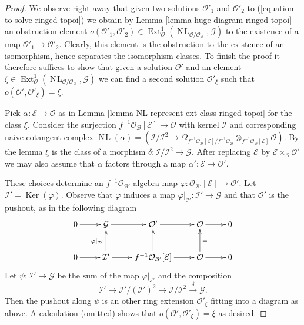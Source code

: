 \documentclass{stacks-project}
\theoremstyle{plain}
\theoremstyle{definition}
\theoremstyle{remark}
\numberwithin{equation}{subsection}
\def\Ext{\mathop{\mathrm{Ext}}\nolimits}
\def\NL{\mathop{N\!L}\nolimits}
\def\Ker{\mathop{\mathrm{Ker}}}
\begin{document}
\begin{proof}
We observe right away that given two solutions $\mathcal{O}'_1$ and
$\mathcal{O}'_2$ to (\ref{equation-to-solve-ringed-topoi}) we obtain by
Lemma \ref{lemma-huge-diagram-ringed-topoi} an obstruction element
$o(\mathcal{O}'_1, \mathcal{O}'_2) \in \Ext^1_\mathcal{O}(
\NL_{\mathcal{O}/\mathcal{O}_\mathcal{B}}, \mathcal{G})$
to the existence of a map $\mathcal{O}'_1 \to \mathcal{O}'_2$.
Clearly, this element
is the obstruction to the existence of an isomorphism, hence separates
the isomorphism classes. To finish the proof it therefore suffices to
show that given a solution $\mathcal{O}'$ and an element
$\xi \in \Ext^1_\mathcal{O}(
\NL_{\mathcal{O}/\mathcal{O}_\mathcal{B}}, \mathcal{G})$
we can find a second solution $\mathcal{O}'_\xi$ such that
$o(\mathcal{O}', \mathcal{O}'_\xi) = \xi$.

\medskip\noindent
Pick $\alpha : \mathcal{E} \to \mathcal{O}$ as in
Lemma \ref{lemma-NL-represent-ext-class-ringed-topoi}
for the class $\xi$. Consider the surjection
$f^{-1}\mathcal{O}_\mathcal{B}[\mathcal{E}] \to \mathcal{O}$
with kernel $\mathcal{I}$ and corresponding naive cotangent complex
$\NL(\alpha) = (\mathcal{I}/\mathcal{I}^2 \to
\Omega_{f^{-1}\mathcal{O}_\mathcal{B}[\mathcal{E}]/
f^{-1}\mathcal{O}_\mathcal{B}}
\otimes_{f^{-1}\mathcal{O}_\mathcal{B}[\mathcal{E}]} \mathcal{O})$.
By the lemma $\xi$ is the class of a morphism
$\delta : \mathcal{I}/\mathcal{I}^2 \to \mathcal{G}$.
After replacing $\mathcal{E}$ by
$\mathcal{E} \times_\mathcal{O} \mathcal{O}'$ we may also assume
that $\alpha$ factors through a map
$\alpha' : \mathcal{E} \to \mathcal{O}'$.

\medskip\noindent
These choices determine an $f^{-1}\mathcal{O}_{\mathcal{B}'}$-algebra map
$\varphi : \mathcal{O}_{\mathcal{B}'}[\mathcal{E}] \to \mathcal{O}'$.
Let $\mathcal{I}' = \Ker(\varphi)$.
Observe that $\varphi$ induces a map
$\varphi|_{\mathcal{I}'} : \mathcal{I}' \to \mathcal{G}$
and that $\mathcal{O}'$ is the pushout, as in the following
diagram
$$
\xymatrix{
0 \ar[r] & \mathcal{G} \ar[r] & \mathcal{O}' \ar[r] &
\mathcal{O} \ar[r] & 0 \\
0 \ar[r] & \mathcal{I}' \ar[u]^{\varphi|_{\mathcal{I}'}} \ar[r] &
f^{-1}\mathcal{O}_{\mathcal{B}'}[\mathcal{E}] \ar[u] \ar[r] &
\mathcal{O} \ar[u]_{=} \ar[r] & 0
}
$$
Let $\psi : \mathcal{I}' \to \mathcal{G}$ be the sum of the map
$\varphi|_{\mathcal{I}'}$ and the composition
$$
\mathcal{I}' \to \mathcal{I}'/(\mathcal{I}')^2 \to
\mathcal{I}/\mathcal{I}^2 \xrightarrow{\delta} \mathcal{G}.
$$
Then the pushout along $\psi$ is an other ring extension
$\mathcal{O}'_\xi$ fitting into a diagram as above.
A calculation (omitted) shows that $o(\mathcal{O}', \mathcal{O}'_\xi) = \xi$
as desired.
\end{proof}
\end{document}
